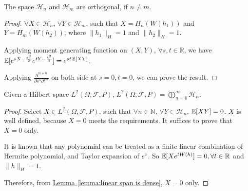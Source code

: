 \begin{lemma}
The space $\mathcal{H}_n$ and $\mathcal{H}_m$ are orthogonal, if $n \neq m$. 
\end{lemma}

\begin{proof}
$\forall X \in \mathcal{H}_n$, 
$\forall Y \in \mathcal{H}_m$, 
such that $X = H_n(W(h_1))$ and $Y = H_m(W(h_2))$, 
where $\lVert h_1 \rVert_{H} = 1$ 
and $\lVert h_2 \rVert_{H} = 1$. 

Applying moment generating function on $(X, Y)$, 
$\forall s, t \in \mathbb{R}$, 
we have $\operatorname{\mathbb{E}}[e^{sX - \frac{s^2}{2}}e^{tY - \frac{t^2}{2}}] 
= e^{st\operatorname{\mathbb{E}}[XY]}$. 

Applying $\frac{\partial^{m+n}}{\partial s^{n} \partial t^{m}}$ on both side at 
$s=0, t=0$, we can prove the result. 
\end{proof}

\begin{theorem}
Given a Hilbert space $L^2(\Omega, \mathcal{F}, P)$, $L^2(\Omega, \mathcal{F}, P) = \bigoplus_{n=0}^{\infty} \mathcal{H}_n$.  
\end{theorem}

\begin{proof}
Select $X \in L^2(\Omega, \mathcal{F}, P)$, 
such that $\forall n \in \mathbb{N}$, $\forall Y \in \mathcal{H}_n$, 
$\operatorname{\mathbb{E}}[XY] = 0$. $X$ is well defined, because $X=0$ meets the requirements. It suffices to prove that $X = 0$ only. 

It is known that any polynomial can be treated as a finite linear combination of Hermite polynomial, 
and Taylor expansion of $e^x$. So $\operatorname{\mathbb{E}}[X e^{t W(h)}] = 0, \forall t \in \mathbb{R}$ and $\lVert h \rVert_{H} = 1$. 

Therefore, from \hyperref[lemma:linear span is dense]
{Lemma \ref*{lemma:linear span is dense}}, $X = 0$ only. 
\end{proof}

%
%    
